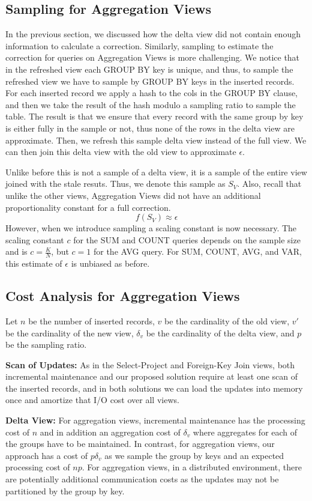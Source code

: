 \subsection{Sampling for Aggregation Views}
In the previous section, we discussed how the delta view did not contain enough
information to calculate a correction.
Similarly, sampling to estimate the correction for queries on Aggregation Views
is more challenging.
We notice that in the refreshed view each GROUP BY key is unique, and
thus, to sample the refreshed view we have to sample by GROUP BY keys
in the inserted records. For each inserted record we apply a hash
to the cols in the GROUP BY clause, and then we take the result of
the hash modulo a sampling ratio to sample the table. The result is
that we ensure that every record with the same group by key is either
fully in the sample or not, thus none of the rows in the delta view
are approximate. 
Then, we refresh this sample delta view instead of the full view.
We can then join this delta view with the old view to approximate $\epsilon$.

Unlike before this is not a sample of a delta view, it is a sample of the entire view joined with the stale resuts.
Thus, we denote this sample as $S_{V}$.
Also, recall that unlike the other views, Aggregation Views did not have 
an additional proportionality constant for a full correction.
\[
f(S_{V})\approx\epsilon
\]
However, when we introduce sampling a scaling constant is now necessary.
The scaling constant $c$ for the SUM and COUNT queries depends on the sample size and is $c = \frac{K}{N}$, 
but $c = 1$ for the AVG query.
For SUM, COUNT, AVG, and VAR, this estimate of $\epsilon$ is unbiased as before.

\subsection{Cost Analysis for Aggregation Views}
Let $n$ be the number of inserted records, $v$ be the cardinality of the old view, $v'$ be the cardinality of the new view, $\delta_v$ be the cardinality of the delta view, and $p$ be the sampling ratio.  

\textbf{Scan of Updates: }
As in the Select-Project and Foreign-Key Join views, both incremental maintenance and our proposed solution require at least one scan of the inserted records, and in both solutions we can load the updates into memory once and amortize that I/O cost over all views. 

\textbf{Delta View: }  For aggregation views, incremental maintenance has the processing cost of $n$ and in addition an aggregation cost of $\delta_v$ where aggregates for each of the groups have to be maintained. In contrast, for aggregation views, our approach has a cost of $p\delta_v$ as we sample the group by keys and an expected processing cost of $np$. 
For aggregation views, in a distributed environment, there are potentially additional communication costs as the updates may not be partitioned by the group by key.


